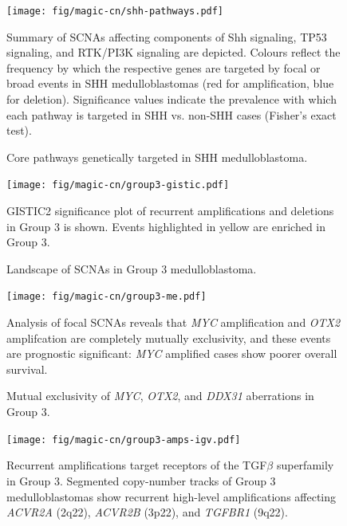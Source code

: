 \documentclass[11pt,letterpaper]{article}
\theoremstyle{definition}
\begin{document}
\begin{figure}[h]
	\begin{center}
		\texttt{[image: fig/magic-cn/shh-pathways.pdf]}
	\end{center}
	\caption{Core pathways genetically targeted in SHH medulloblastoma.}
	Summary of SCNAs affecting components of Shh signaling, TP53 signaling, and RTK/PI3K signaling are depicted. Colours reflect the frequency by which the respective genes are targeted by focal or broad events in SHH medulloblastomas (red for amplification, blue for deletion). Significance values indicate the prevalence with which each pathway is targeted in SHH vs. non-SHH cases (Fisher's exact test).
	\label{fig:shh-pathways}
\end{figure}

\clearpage

\begin{figure}[h]
	\begin{center}
		\texttt{[image: fig/magic-cn/group3-gistic.pdf]}
	\end{center}
	\caption{Landscape of SCNAs in Group 3 medulloblastoma.}
	GISTIC2 significance plot of recurrent amplifications and deletions in Group 3 is shown. Events highlighted in yellow are enriched in Group 3.
	\label{fig:group3-gistic}
\end{figure}

\clearpage

\begin{figure}[h]
	\begin{center}
		\texttt{[image: fig/magic-cn/group3-me.pdf]}
	\end{center}
	\caption{Mutual exclusivity of \emph{MYC}, \emph{OTX2}, and \emph{DDX31} aberrations in Group 3.}
	Analysis of focal SCNAs reveals that \emph{MYC} amplification and \emph{OTX2} amplifcation are completely mutually exclusivity, and these events are prognostic significant: \emph{MYC} amplified cases show poorer overall survival.
	\label{fig:group3-me}
\end{figure}

\begin{figure}
	\centering
	\texttt{[image: fig/magic-cn/group3-amps-igv.pdf]}
	\caption{Recurrent amplifications target receptors of the TGF$\beta$ superfamily in Group 3.
		Segmented copy-number tracks of Group 3 medulloblastomas show recurrent high-level amplifications affecting \emph{ACVR2A} (2q22), \emph{ACVR2B} (3p22), and \emph{TGFBR1} (9q22).}
	\label{fig:group3-amps-igv}
\end{figure}
\end{document}
